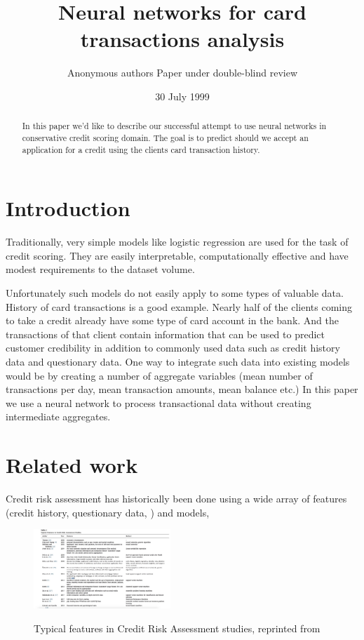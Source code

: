 \documentclass{sigkddExp}
\begin{document}
\title{Neural networks for card transactions analysis}

\author{
\alignauthor Anonymous authors
Paper under double-blind review
}

\date{30 July 1999}
\maketitle
\begin{abstract}
In this paper we'd like to describe our successful attempt to use neural networks in conservative credit scoring domain.
The goal is to predict should we accept an application for a credit using the clients card transaction history.
\end{abstract}

\section{Introduction}
Traditionally, very simple models like logistic regression are used for the task of credit scoring. They are easily interpretable, computationally effective and have modest requirements to the dataset volume.

Unfortunately such models do not easily apply to some types of valuable data. History of card transactions is a good example. Nearly half of the clients coming to take a credit already have some type of card account in the bank. And the transactions of that client contain information that can be used to predict customer credibility in addition to commonly used data such as credit history data and questionary data. One way to integrate such data into existing models would be by creating a number of aggregate variables (mean number of transactions per day, mean transaction amounts, mean balance etc.) In this paper we use a neural network to process transactional data without creating intermediate aggregates.

\section{Related work}

Credit risk assessment has historically been done using a wide array of features (credit history, questionary data, ) and models, 

\begin{figure}
  \caption{Typical features in Credit Risk Assessment studies, reprinted from \protect\cite{RePEc}}
  \includegraphics[width=0.46\textwidth]{risk_features.jpg}
  \label{fig-score-features}
\end{figure}
\end{document}
